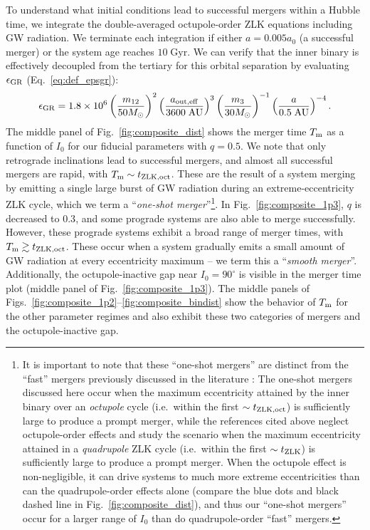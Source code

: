 \documentclass[
        fleqn,
        usenatbib,
    ]{mnras}
\newcommand*{\p}[1]{\left(#1\right)}
\begin{document}
To understand what initial conditions lead to successful mergers within a Hubble
time, we integrate the double-averaged octupole-order ZLK equations including GW
radiation. We terminate each integration if either $a = 0.005a_0$ (a successful
merger) or the system age reaches $10\;\mathrm{Gyr}$. We can
verify that the inner binary is effectively decoupled from the tertiary for this
orbital separation by evaluating $\epsilon_{\rm GR}$ (Eq.~\ref{eq:def_epsgr}):
\begin{equation}
    \epsilon_{\rm GR} = 1.8 \times 10^6
        \p{\frac{m_{12}}{50 M_{\odot}}}^2
        \p{\frac{a_{\rm out, eff}}{3600\;\mathrm{AU}}}^3
        \p{\frac{m_3}{30M_{\odot}}}^{-1}
        \p{\frac{a}{0.5\;\mathrm{AU}}}^{-4}.
        \label{eq:epsgr_0005}
\end{equation}
The middle panel of Fig.~\ref{fig:composite_dist} shows the merger time $T_{\rm
m}$ as a function of $I_0$ for our fiducial parameters with $q = 0.5$. We note
that only retrograde inclinations lead to successful mergers, and almost all
successful mergers are rapid, with $T_{\rm m} \sim t_{\rm ZLK, oct}$. These are
the result of a system merging by emitting a single large burst of GW radiation
during an extreme-eccentricity ZLK cycle, which we term a ``\emph{one-shot
merger}''\footnote{It is important to note that these ``one-shot
mergers'' are distinct from the ``fast'' mergers previously discussed in the
literature \citep[e.g.][]{wen2003eccentricity, randall2018analytical,
su2020spin}: The one-shot mergers discussed here occur when the
maximum eccentricity attained by the inner binary over an \emph{octupole} cycle
(i.e.\ within the first $\sim t_{\rm ZLK, oct}$) is sufficiently large to
produce a prompt merger, while the references cited above neglect octupole-order
effects and study the scenario when the maximum eccentricity attained in a
\emph{quadrupole} ZLK cycle (i.e.\ within the first $\sim t_{\rm ZLK}$) is
sufficiently large to produce a prompt merger. When the octupole effect is
non-negligible, it can drive systems to much more extreme eccentricities than
can the quadrupole-order effects alone (compare the blue dots and black dashed
line in Fig.~\ref{fig:composite_dist}), and thus our ``one-shot mergers'' occur
for a larger range of $I_0$ than do quadrupole-order ``fast'' mergers.}. In
Fig.~\ref{fig:composite_1p3}, $q$ is decreased to $0.3$, and some prograde
systems are also able to merge successfully. However, these prograde systems
exhibit a broad range of merger times, with $T_{\rm m} \gtrsim t_{\rm ZLK,
oct}$. These occur when a system gradually emits a small amount of GW radiation
at every eccentricity maximum -- we term this a %
``\emph{smooth merger}''. Additionally, the octupole-inactive gap near $I_0 =
90^\circ$ is visible in the merger time plot (middle panel of
Fig.~\ref{fig:composite_1p3}). The middle panels of
Figs.~\ref{fig:composite_1p2}--\ref{fig:composite_bindist} show the behavior of
$T_{\rm m}$ for the other parameter regimes and also exhibit these two
categories of mergers and the octupole-inactive gap.
\end{document}
